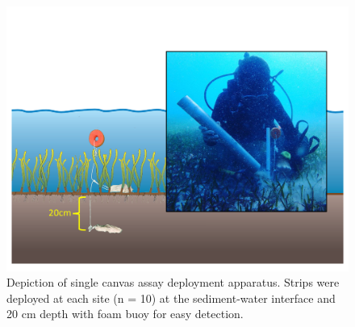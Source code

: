 \begin{figure}[ht]
  \centering
   \includegraphics[width=.99\textwidth,clip, trim={1.7cm 2.5cm 1.0cm 3.2cm}]{OEM4_deployment_method}
\caption[Canvas assay deployment apparatus]{Depiction of single canvas assay deployment apparatus. Strips were deployed at each site (n = 10) at the sediment-water interface and 20 cm depth with foam buoy for easy detection.}
  \label{fig:2F1}
\end{figure}



